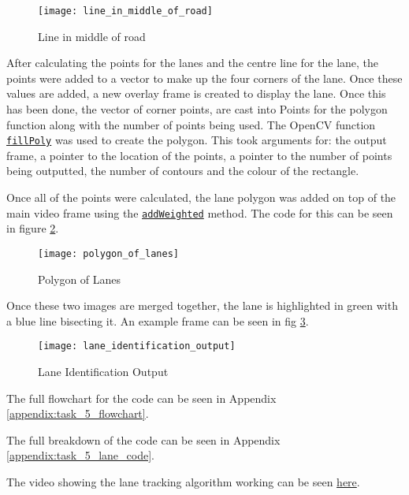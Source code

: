 \documentclass[conference]{IEEEtran}
\begin{document}
\begin{figure}[H]
\centerline{\texttt{[image: line\_in\_middle\_of\_road]}}
\caption{Line in middle of road}
\label{fig:line_in_middle_of_road}
\end{figure}

After calculating the points for the lanes and the centre line for the lane, the points were added to a vector to make up the four corners of the lane. Once these values are added, a new overlay frame is created to display the lane. Once this has been done, the vector of corner points, are cast into Points for the polygon function along with the number of points being used. The OpenCV function \href{https://docs.opencv.org/4.x/d6/d6e/group__imgproc__draw.html#ga311160e71d37e3b795324d097cb3a7dc}{\texttt{fillPoly}} was used to create the polygon. This took arguments for: the output frame, a pointer to the location of the points, a pointer to the number of points being outputted, the number of contours and the colour of the rectangle.

Once all of the points were calculated, the lane polygon was added on top of the main video frame using the \href{https://docs.opencv.org/4.x/d2/de8/group__core__array.html#gafafb2513349db3bcff51f54ee5592a19}{\texttt{addWeighted}} method. The code for this can be seen in figure \ref{fig:polygon_of_lanes}.

\begin{figure}[H]
\centerline{\texttt{[image: polygon\_of\_lanes]}}
\caption{Polygon of Lanes}
\label{fig:polygon_of_lanes}
\end{figure}

Once these two images are merged together, the lane is highlighted in green with a blue line bisecting it. An example frame can be seen in fig \ref{fig:lane_identification_output}.

\begin{figure}[H]
\centerline{\texttt{[image: lane\_identification\_output]}}
\caption{Lane Identification Output}
\label{fig:lane_identification_output}
\end{figure}

The full flowchart for the code can be seen in Appendix \ref{appendix:task_5_flowchart}.

The full breakdown of the code can be seen in Appendix \ref{appendix:task_5_lane_code}.

The video showing the lane tracking algorithm working can be seen \href{https://youtu.be/Xw9haUy82Ps}{here}.
\end{document}
